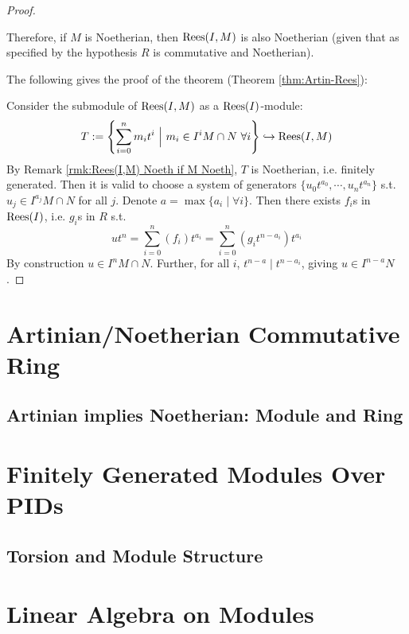 \documentclass{article}
\begin{document}
\begin{proof}
\begin{remark}
        Therefore, if $M$ is Noetherian, then $\mathrm{Rees}(I, M)$ is also Noetherian (given that as specified by the hypothesis $R$ is commutative and Noetherian).
    \end{remark}

    The following gives the proof of the theorem (Theorem \ref{thm:Artin-Rees}):

    Consider the submodule of $\mathrm{Rees}(I, M)$ as a $\mathrm{Rees}(I)$-module:
    \[
        T := \left\{ \sum\limits_{i=0}^n m_i t^i \ \Big|\  m_i\in I^i M\cap N\ \forall i \right\} \hookrightarrow \mathrm{Rees}(I, M)
    \]
    By Remark \ref{rmk:Rees(I,M) Noeth if M Noeth}, $T$ is Noetherian, i.e. finitely generated. Then it is valid to choose a system of generators $\{ u_0 t^{a_0}, \cdots, u_n t^{a_n} \}$ s.t. $u_j \in I^{a_j} M \cap N$ for all $j$. Denote $a = \max\{ a_i \mid \forall i \}$. Then there exists $f_i$s in $\mathrm{Rees}(I)$, i.e. $g_i$s in $R$ s.t.
    \[
        ut^n = \sum\limits_{i=0}^n (f_i) t^{a_i} = \sum\limits_{i=0}^n (g_i t^{n - a_i}) t^{a_i}
    \]
    By construction $u\in I^nM\cap N$. Further, for all $i$, $t^{n-a} \mid t^{n-a_i}$, giving $u\in I^{n-a}N$.
\end{proof}

\section{Artinian/Noetherian Commutative Ring}

\subsection{Artinian implies Noetherian: Module and Ring}

\section{Finitely Generated Modules Over PIDs}

\subsection{Torsion and Module Structure}

\section{Linear Algebra on Modules}
\end{document}
